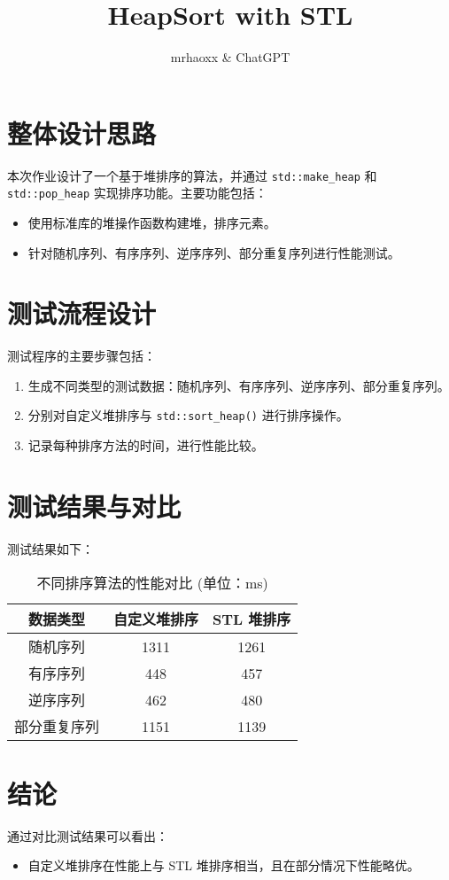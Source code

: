 \documentclass[UTF8]{ctexart}
\begin{document}
\pagestyle{fancy}
\fancyhead{}

\title{HeapSort with STL}
\author{mrhaoxx \& ChatGPT}

\maketitle

\section{整体设计思路}
本次作业设计了一个基于堆排序的算法，并通过 \texttt{std::make\_heap} 和 \texttt{std::pop\_heap} 实现排序功能。主要功能包括：
\begin{itemize}
    \item 使用标准库的堆操作函数构建堆，排序元素。
    \item 针对随机序列、有序序列、逆序序列、部分重复序列进行性能测试。
\end{itemize}

\section{测试流程设计}
测试程序的主要步骤包括：
\begin{enumerate}
    \item 生成不同类型的测试数据：随机序列、有序序列、逆序序列、部分重复序列。
    \item 分别对自定义堆排序与 \texttt{std::sort\_heap()} 进行排序操作。
    \item 记录每种排序方法的时间，进行性能比较。
\end{enumerate}

\section{测试结果与对比}
测试结果如下：
\begin{table}[H]
    \centering
    \caption{不同排序算法的性能对比 (单位：ms)}
    \begin{tabular}{|c|c|c|}
        \hline
        数据类型 & 自定义堆排序 & STL 堆排序 \\
        \hline
        随机序列 & 1311 & 1261 \\
        \hline
        有序序列 & 448 & 457 \\
        \hline
        逆序序列 & 462 & 480 \\
        \hline
        部分重复序列 & 1151 & 1139 \\
        \hline
    \end{tabular}
\end{table}

\section{结论}
通过对比测试结果可以看出：
\begin{itemize}
    \item 自定义堆排序在性能上与 STL 堆排序相当，且在部分情况下性能略优。
\end{itemize}
\end{document}
